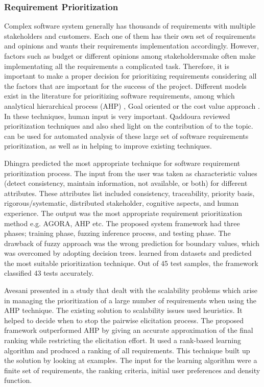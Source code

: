 \subsubsection{Requirement Prioritization}
Complex software system generally has thousands of requirements with multiple
stakeholders and customers. Each one of them has their own set of requirements
and opinions and wants their requirements implementation accordingly. However,
factors such as budget or different opinions among stakeholdersmake often make
implementating all the requirements a complicated task. Therefore, it is
important to make a proper decision for prioritizing requirements considering
all the factors that are important for the success of the project. Different
models exist in the literature for prioritizing software requirements, among
which analytical hierarchical process (AHP) \cite{saaty2008}, Goal oriented
\cite{VanLamsweerde:2001} or the cost value approach \cite{Karlsson:1997}. In
these techniques, human input is very important. Qaddoura \etal
\cite{R.Qaddoura} reviewed  prioritization techniques and also shed light on the
contribution of \ML to the topic. \ML can be used for automated analysis of
these large set of software requirements prioritization, as well as in helping
to improve existing techniques.

Dhingra \etal  \cite{S.Dhingra} predicted the most appropriate technique for software requirement prioritization process.
The input from the user was taken as characteristic values (detect consistency, maintain information, not
available, or both) for different attributes. These attributes list included
consistency, traceability, priority basis, rigorous/systematic, distributed
stakeholder, cognitive aspects, and human experience. The output was the most
appropriate requirement prioritization method e.g. AGORA, AHP etc. The proposed
system framework had three phases; training phase, fuzzing inference process,
and testing phase. The drawback of fuzzy approach was the wrong prediction for
boundary values, which was overcomed by adopting decision trees. \DT learned
from datasets and predicted the most suitable prioritization technique. Out of
45 test samples, the framework classified 43 tests accurately.

Avesani \etal presented in \cite{PAvesani} a study that dealt with the
scalability problems which arise in managing the prioritization of a large number of
requirements when using the AHP technique. The existing solution to
scalability issues used heuristics. It helped to decide when
to stop the pairwise elicitation process. The proposed framework outperformed AHP by giving
an accurate approximation of the final ranking while restricting the elicitation
effort. It used a rank-based learning algorithm and produced a ranking of all
requirements. This technique built up the solution by looking at
examples. The input for the learning algorithm were a finite set
of requirements, the ranking criteria, initial user preferences and density function.

